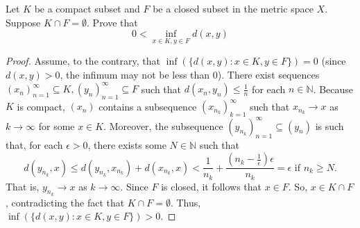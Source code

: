 \documentclass{article}
\begin{document}
\begin{problem}[Fall 2002~\#1]
Let \(K\) be a compact subset and \(F\) be a closed subset in the metric space
\(X\).  Suppose \(K\cap  F = \emptyset\).  Prove that
\[
	0 < \inf_{x\in K, y\in F}d(x,y)
\]
\end{problem}
\begin{proof}
	Assume, to the contrary, that \(\inf \left(\{d(x,y) : x\in K, y\in
	F\}\right) = 0\) (since \(d(x,y) > 0\), the infimum may not be less than 0).
	There exist sequences \((x_n)_{n=1}^{\infty}\subseteq K,
	(y_n)_{n=1}^{\infty}\subseteq F\) such that \(d(x_n,y_n)\leq \frac{1}{n}\)
	for each \(n\in \mathbb{N}\).  Because \(K\) is compact, \((x_n)\) contains a
	subsequence \((x_{n_k})_{k=1}^{\infty}\) such that \(x_{n_k}\to x\) as \(k\to
	\infty\) for some \(x\in K\).  Moreover, the subsequence
	\((y_{n_k})_{n=1}^{\infty}\subseteq (y_n)\) is such that, for each \(\epsilon > 0\), there exists some \(N\in \mathbb{N}\) such that
	\[
		d(y_{n_k}, x) \leq d(y_{n_k}, x_{n_k}) + d(x_{n_k}, x) < \frac{1}{n_k} + \frac{\left(n_k-\frac{1}{\epsilon}\right) \epsilon}{n_k} = \epsilon \text{ if } n_k\ge N
		.\]
	That is, \(y_{n_k}\to x\) as \(k\to \infty\).  Since \(F\) is closed, it
	follows that \(x\in F\).  So, \(x\in K\cap F\), contradicting the fact that
	\(K\cap F = \emptyset\).  Thus, \(\inf \left(\{d(x,y) : x\in K, y\in
	F\}\right) > 0\).
\end{proof}
\end{document}
